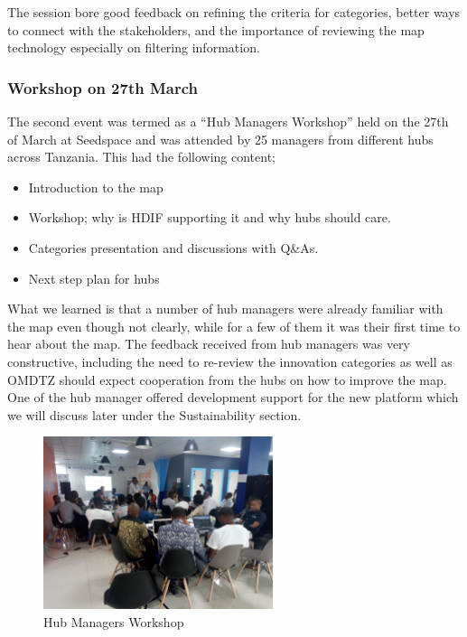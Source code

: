 \documentclass[a4paper,12pt,twoside]{article}
\begin{document}
The session bore good feedback on refining the criteria for categories, better ways to connect with the stakeholders, and the importance of reviewing the map technology especially on filtering information.

\subsubsection{Workshop on 27th March}
The second event was termed as a “Hub Managers Workshop” held on the 27th of March at Seedspace and was attended by 25 managers from different hubs across Tanzania. This had the following content;

\begin{itemize}
    \item Introduction to the map
    \item Workshop; why is HDIF supporting it and why hubs should care.
    \item Categories presentation and discussions with Q&As.
    \item Next step plan for hubs
\end{itemize}

What we learned is that a number of hub managers were already familiar with the map  even though not clearly, while for a few of them it was their first time to hear about the map. The feedback received from hub managers was very constructive, including the need to re-review the innovation categories as well as OMDTZ should expect cooperation from the hubs on how to improve the map. One of the hub manager offered development support for the new platform which we will discuss later under the Sustainability section. 

\begin{figure}[h]
  \centering
  \caption{Hub Managers Workshop}
 \includegraphics[width=0.6\textwidth]{images/seed_star_workshop.jpg}
\end{figure}
\end{document}
